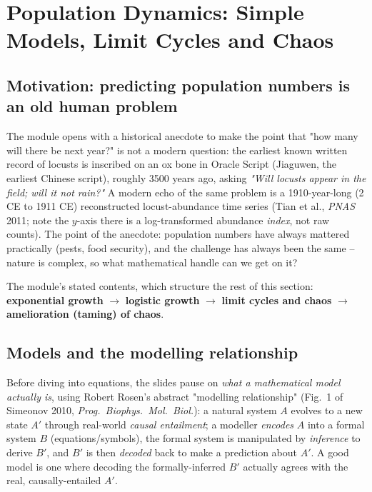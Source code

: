 \documentclass[11pt,a4paper]{article}
\begin{document}
\newpage

\section{Population Dynamics: Simple Models, Limit Cycles and Chaos}

\subsection{Motivation: predicting population numbers is an old human problem}
The module opens with a historical anecdote to make the point that "how many will there be next year?" is not a modern question: the earliest known written record of locusts is inscribed on an ox bone in Oracle Script (Jiaguwen, the earliest Chinese script), roughly 3500 years ago, asking \emph{"Will locusts appear in the field; will it not rain?"} A modern echo of the same problem is a 1910-year-long (2 CE to 1911 CE) reconstructed locust-abundance time series (Tian et al., \emph{PNAS} 2011; note the $y$-axis there is a log-transformed abundance \emph{index}, not raw counts). The point of the anecdote: population numbers have always mattered practically (pests, food security), and the challenge has always been the same -- nature is complex, so what mathematical handle can we get on it?

The module's stated contents, which structure the rest of this section: \textbf{exponential growth} $\to$ \textbf{logistic growth} $\to$ \textbf{limit cycles and chaos} $\to$ \textbf{amelioration (taming) of chaos}.

\subsection{Models and the modelling relationship}
Before diving into equations, the slides pause on \emph{what a mathematical model actually is}, using Robert Rosen's abstract "modelling relationship" (Fig.\ 1 of Simeonov 2010, \emph{Prog.\ Biophys.\ Mol.\ Biol.}): a natural system $A$ evolves to a new state $A'$ through real-world \emph{causal entailment}; a modeller \emph{encodes} $A$ into a formal system $B$ (equations/symbols), the formal system is manipulated by \emph{inference} to derive $B'$, and $B'$ is then \emph{decoded} back to make a prediction about $A'$. A good model is one where decoding the formally-inferred $B'$ actually agrees with the real, causally-entailed $A'$.
\end{document}
